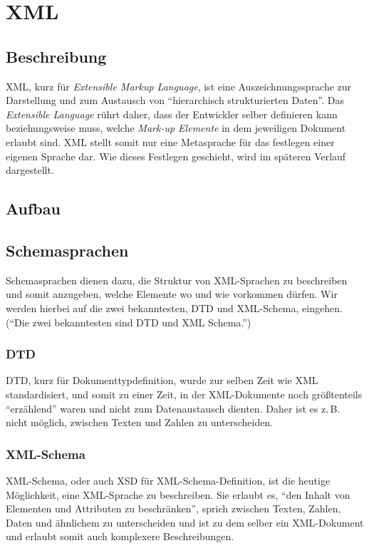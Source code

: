 \chapter{XML}
\section{Beschreibung}
XML, kurz für {\em Extensible Markup Language}, ist eine
Auszeichnungssprache zur Darstellung und zum Austausch von
\enquote{hierarchisch strukturierten Daten}\cite{wiki:de:xml}. Das
{\em Extensible Language} rührt daher, dass der Entwickler selber
definieren kann beziehungsweise muss, welche {\em Mark-up Elemente} in
dem jeweiligen Dokument erlaubt sind. XML stellt somit nur eine
Metasprache für das festlegen einer eigenen Sprache dar. Wie dieses
Festlegen geschieht, wird im späteren Verlauf dargestellt.

\section{Aufbau}


\section{Schemasprachen}
Schemasprachen dienen dazu, die Struktur von XML-Sprachen zu
beschreiben und somit anzugeben, welche Elemente wo und wie vorkommen
dürfen. Wir werden hierbei auf die zwei bekanntesten, DTD und XML-Schema, eingehen.
(\enquote{Die zwei bekanntesten sind DTD und XML Schema.}\cite{wiki:de:xml})
\subsection{DTD}
DTD, kurz für Dokumenttypdefinition, wurde zur selben Zeit wie XML
standardisiert, und somit zu einer Zeit, in der XML-Dokumente noch
größtenteils "`erzählend"' waren und nicht zum Datenaustausch dienten.
Daher ist es z.\,B. nicht möglich, zwischen Texten und Zahlen zu
unterscheiden.

\subsection{XML-Schema}
XML-Schema, oder auch XSD für XML-Schema-Definition, ist die heutige
Möglichkeit, eine XML-Sprache zu beschreiben. Sie erlaubt es,
\enquote{den Inhalt von Elementen und Attributen zu
  beschränken}\cite{wiki:de:xml}, sprich zwischen Texten, Zahlen,
Daten und ähnlichem zu unterscheiden und ist zu dem selber ein
XML-Dokument und erlaubt somit auch komplexere Beschreibungen.

